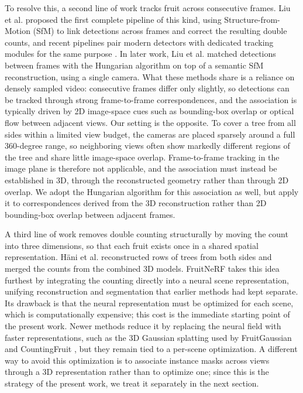 \documentclass[english, egger, bsc]{vcethesis}
\begin{document}
To resolve this, a second line of work tracks fruit across consecutive frames. Liu et al. \cite{liu2018} proposed the first complete pipeline of this kind, using Structure-from-Motion (SfM) to link detections across frames and correct the resulting double counts, and recent pipelines pair modern detectors with dedicated tracking modules for the same purpose \cite{rameshchandra2025}. In later work, Liu et al. \cite{liu2019} matched detections between frames with the Hungarian algorithm on top of a semantic SfM reconstruction, using a single camera. What these methods share is a reliance on densely sampled video: consecutive frames differ only slightly, so detections can be tracked through strong frame-to-frame correspondences, and the association is typically driven by 2D image-space cues such as bounding-box overlap or optical flow between adjacent views. Our setting is the opposite. To cover a tree from all sides within a limited view budget, the cameras are placed sparsely around a full 360-degree range, so neighboring views often show markedly different regions of the tree and share little image-space overlap. Frame-to-frame tracking in the image plane is therefore not applicable, and the association must instead be established in 3D, through the reconstructed geometry rather than through 2D overlap. We adopt the Hungarian algorithm for this association as well, but apply it to correspondences derived from the 3D reconstruction rather than 2D bounding-box overlap between adjacent frames.

A third line of work removes double counting structurally by moving the count into three dimensions, so that each fruit exists once in a shared spatial representation. Häni et al. \cite{haeni2019} reconstructed rows of trees from both sides and merged the counts from the combined 3D models. FruitNeRF \cite{meyer2024fruitnerf} takes this idea furthest by integrating the counting directly into a neural scene representation, unifying reconstruction and segmentation that earlier methods had kept separate. Its drawback is that the neural representation must be optimized for each scene, which is computationally expensive; this cost is the immediate starting point of the present work. Newer methods reduce it by replacing the neural field with faster representations, such as the 3D Gaussian splatting used by FruitGaussian \cite{hong2025} and CountingFruit \cite{li2025}, but they remain tied to a per-scene optimization. A different way to avoid this optimization is to associate instance masks across views through a 3D representation rather than to optimize one; since this is the strategy of the present work, we treat it separately in the next section.
\end{document}
